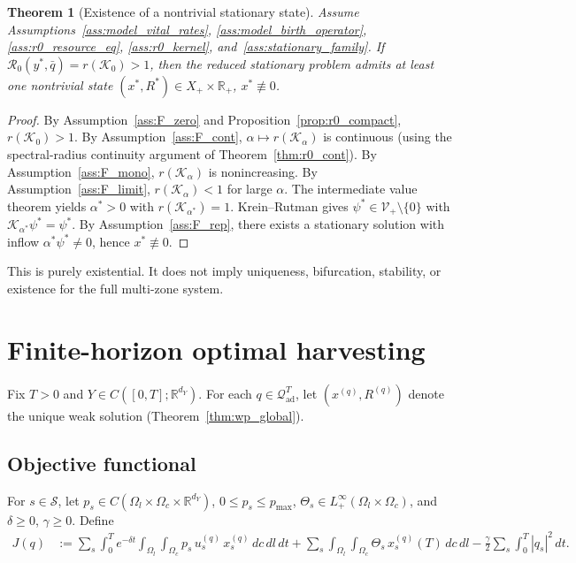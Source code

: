 \documentclass[pdflatex,sn-mathphys-num]{sn-jnl}%
\newtheorem{theorem}{Theorem}[section]
\begin{document}
\begin{theorem}[Existence of a nontrivial stationary state]%
\label{thm:stationary_existence}
Assume Assumptions~\ref{ass:model_vital_rates}, \ref{ass:model_birth_operator}, \ref{ass:r0_resource_eq}, \ref{ass:r0_kernel}, and~\ref{ass:stationary_family}. If
\(\mathcal R_0(y^\ast,\bar q)=r(\mathcal K_0)>1\),
then the reduced stationary problem admits at least one nontrivial state
\((x^\ast,R^\ast)\in X_+\times\mathbb R_+\), \(x^\ast\not\equiv 0\).
\end{theorem}
\begin{proof}
By Assumption~\ref{ass:F_zero} and Proposition~\ref{prop:r0_compact}, \(r(\mathcal K_0)>1\).
By Assumption~\ref{ass:F_cont}, \(\alpha\mapsto r(\mathcal K_\alpha)\) is continuous (using
the spectral-radius continuity argument of Theorem~\ref{thm:r0_cont}).
By Assumption~\ref{ass:F_mono}, \(r(\mathcal K_\alpha)\) is nonincreasing.
By Assumption~\ref{ass:F_limit}, \(r(\mathcal K_\alpha)<1\) for large \(\alpha\).
The intermediate value theorem yields \(\alpha^\ast>0\) with
\(r(\mathcal K_{\alpha^\ast})=1\).
Krein--Rutman \cite{KreinRutman1948,liu2025bidirectional,Deimling1985} gives \(\psi^\ast\in\mathcal V_+\setminus\{0\}\) with
\(\mathcal K_{\alpha^\ast}\psi^\ast=\psi^\ast\).
By Assumption~\ref{ass:F_rep}, there exists a stationary solution with inflow
\(\alpha^\ast\psi^\ast\neq 0\), hence \(x^\ast\not\equiv 0\).
\end{proof}

This is purely existential. It does not imply uniqueness, bifurcation, stability, or
existence for the full multi-zone system.

\section{Finite-horizon optimal harvesting}\label{sec:optimal_harvest}
Fix \(T>0\) and \(Y\in C([0,T];\mathbb R^{d_Y})\). For each
\(q\in\mathcal Q_{\mathrm{ad}}^T\), let \((x^{(q)},R^{(q)})\) denote
the unique weak solution (Theorem~\ref{thm:wp_global}).

\subsection{Objective functional}
For \(s\in\mathcal S\), let
\(p_s\in C(\Omega_l\times\Omega_c\times\mathbb R^{d_Y})\),
\(0\le p_s\le p_{\max}\),
\(\Theta_s\in L^\infty_+(\Omega_l\times\Omega_c)\),
and \(\delta\ge 0\), \(\gamma\ge 0\). Define
\begin{equation}\label{eq:ocp_J}
\begin{aligned}
J(q)
&:=
\sum_{s}\int_0^T e^{-\delta t}
\int_{\Omega_l}\!\int_{\Omega_c}
p_s\,u_s^{(q)}\,x_s^{(q)}\,dc\,dl\,dt
+\sum_s\int_{\Omega_l}\!\int_{\Omega_c}\Theta_s\,x_s^{(q)}(T)\,dc\,dl
-\frac{\gamma}{2}\sum_s\int_0^T|q_s|^2\,dt.
\end{aligned}
\end{equation}
\end{document}
